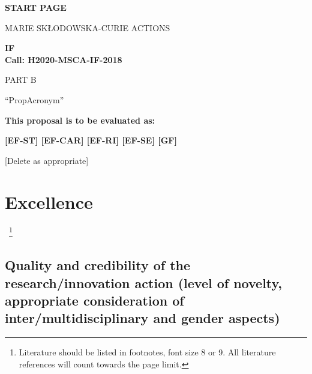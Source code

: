 
\phantom{a}
\vspace{15mm}
\begin{center}


        \Large{
      
     
        \textbf{START PAGE}
  
          \vspace{15mm}
          MARIE SK\L{}ODOWSKA-CURIE ACTIONS\\
          \vspace{1cm}
          
          \textbf{\acf{IF}}\\
          \textbf{Call: H2020-MSCA-IF-2018}
          \vspace{2cm}                   

          PART B
          \vspace{2.5cm}

          ``{\sc \ac{PropAcronym}\xspace}''
          \vspace{2cm}

          \textbf{This proposal is to be evaluated as:}
          \vspace{.5cm}

          \textbf{[EF-ST] [EF-CAR] [EF-RI] [EF-SE] [GF]}\\
        }
        \large{[Delete as appropriate]}

  \end{center}
\vspace{1cm}

\newpage
\setcounter{tocdepth}{1}
\tableofcontents



\newpage
\markStartPageLimit
\section{Excellence}
\label{sec:excellence}
~\footnote{Literature should be listed in footnotes, font size 8 or 9.
All literature references will count towards the page limit.}

\subsection{Quality and credibility of the research/innovation action (level of novelty, appropriate consideration of inter/multidisciplinary and gender aspects)}
\label{sec:excellence_quality}

